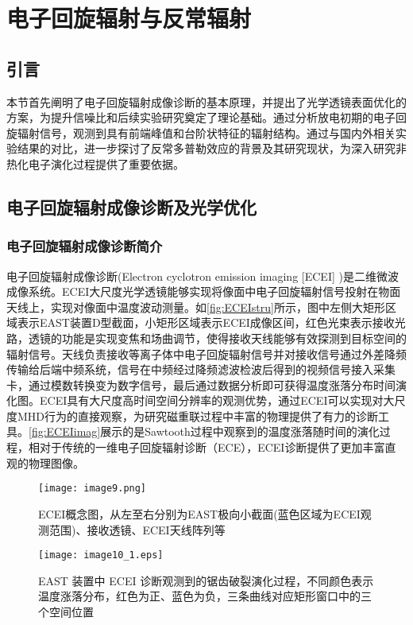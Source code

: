 
\chapter{电子回旋辐射与反常辐射}
\section*{引言}
本节首先阐明了电子回旋辐射成像诊断的基本原理，并提出了光学透镜表面优化的方案，为提升信噪比和后续实验研究奠定了理论基础。通过分析放电初期的电子回旋辐射信号，观测到具有前端峰值和台阶状特征的辐射结构。通过与国内外相关实验结果的对比，进一步探讨了反常多普勒效应的背景及其研究现状，为深入研究非热化电子演化过程提供了重要依据。
\section{电子回旋辐射成像诊断及光学优化}
\subsection{电子回旋辐射成像诊断简介}\label{sec:ECEI}
电子回旋辐射成像诊断\cite{RN1020}(Electron cyclotron emission imaging [ECEI] )是二维微波成像系统。ECEI大尺度光学透镜能够实现将像面中电子回旋辐射信号投射在物面天线上，实现对像面中温度波动测量。如\autoref{fig:ECEIstru}所示，图中左侧大矩形区域表示EAST装置D型截面，小矩形区域表示ECEI成像区间，红色光束表示接收光路，透镜的功能是实现变焦和场曲调节，使得接收天线能够有效探测到目标空间的辐射信号。天线负责接收等离子体中电子回旋辐射信号并对接收信号通过外差降频传输给后端中频系统，信号在中频经过降频滤波检波后得到的视频信号接入采集卡，通过模数转换变为数字信号，最后通过数据分析即可获得温度涨落分布时间演化图。ECEI具有大尺度高时间空间分辨率的观测优势，通过ECEI可以实现对大尺度MHD行为的直接观察，为研究磁重联过程中丰富的物理提供了有力的诊断工具。\autoref{fig:ECEIimag}展示的是Sawtooth\cite{RN1791}过程中观察到的温度涨落随时间的演化过程，相对于传统的一维电子回旋辐射诊断（ECE）\cite{RN742}，ECEI诊断提供了更加丰富直观的物理图像。
\begin{figure}[ht]
  \centering
  \texttt{[image: image9.png]}
  \caption{\label{fig:ECEIstru} ECEI概念图\cite{RN1847}，从左至右分别为EAST极向小截面(蓝色区域为ECEI观测范围)、接收透镜、ECEI天线阵列等 }
\end{figure}


\begin{figure}[h]
  \centering
  \texttt{[image: image10\_1.eps]}
  \caption{\label{fig:ECEIimag}EAST 装置中 ECEI 诊断观测到的锯齿破裂演化过程，不同颜色表示温度涨落分布，红色为正、蓝色为负，三条曲线对应矩形窗口中的三个空间位置}
\end{figure}

